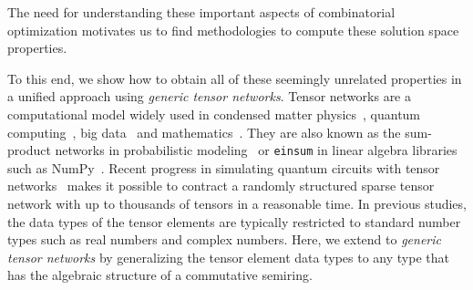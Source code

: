 \documentclass[review, onefignum, onetabnum]{siamart190516}
\begin{document}
The need for understanding these important aspects of combinatorial optimization motivates us to find methodologies to compute these solution space properties.

To this end, we show how to obtain all of these seemingly unrelated properties in a unified approach using
\textit{generic tensor networks}. Tensor networks are a computational model widely used in condensed matter physics~\cite{Orus2014}, quantum computing~\cite{Markov2008}, big data~\cite{Cichocki2014} and mathematics~\cite{Oseledets2011}.
They are also known as the sum-product networks in probabilistic modeling~\cite{Bishop2006} or \texttt{einsum} in linear algebra libraries such as NumPy~\cite{Harris2020}.
Recent progress in simulating quantum circuits with tensor networks~\cite{Gray2021, Pan2021, Kalachev2021} makes it possible to contract a randomly structured sparse tensor network with up to thousands of tensors in a reasonable time.
In previous studies, the data types of the tensor elements are typically restricted to standard number types such as real numbers and complex numbers.
Here, we extend to \textit{generic tensor networks} by generalizing the tensor element data types to any type that has the algebraic structure of a commutative semiring.
\end{document}
